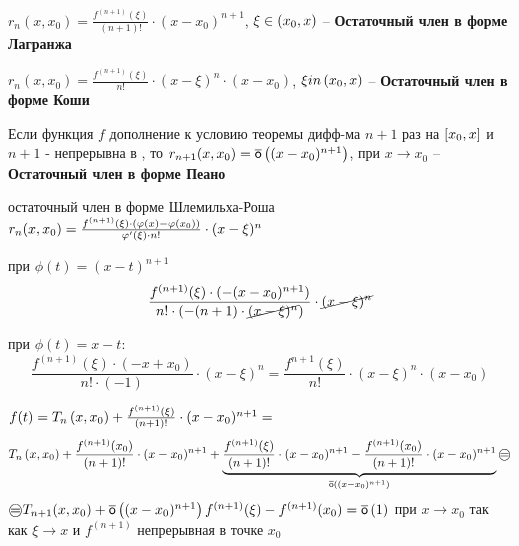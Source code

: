 \begin{sledsv}
	\begin{enumerate*}
		\item $r_n(x,x_0) = \frac{f^{(n+1)}(\xi)}{(n+1)!}\cdot (x-x_0)^{n+1}$, $\xi \in \left( x_0,x\right)$ -- \textbf{Остаточный член в форме Лагранжа}
		\item $r_n(x,x_0) = \frac{f^{(n+1)}(\xi)}{n!}\cdot (x-\xi)^{n}\cdot (x-x_0)$, $\xi in \left( x_0, x\right)$ -- \textbf{Остаточный член в форме Коши}
		\item Если функция $f$ дополнение к условию теоремы дифф-ма $n+1$ раз на $\left[ x_0,x\right]$ и $n+1$ - непрерывна в , то $r_{n+1}(x,x_0) = \overline{\mathsf{o}}\left( (x-x_0)^{n+1}\right)$, при $x \to x_0$  -- \textbf{Остаточный член в форме Пеано}
	\end{enumerate*}

	\begin{dokvo}
		остаточный член в форме Шлемильха-Роша $r_n(x,x_0) = \frac{f^{(n+1)}(\xi)  \cdot (\varphi(x)-\varphi(x_0))}{\varphi^{\prime}(\xi) \cdot n!}\cdot (x-\xi)^{n}$
		\begin{enumerate*}
			\item при $\phi(t) = (x-t)^{n+1}$
			$$\frac{f^{(n+1)}(\xi) \cdot (-(x-x_0)^{n+1})}{n! \cdot (-(n+1)\cdot \cancel{(x - \xi)^{n}})}\cdot \cancel{(x-\xi)^{n}}$$
			\item при $\phi(t) = x - t:$
			$$\frac{f^{(n+1)}(\xi)\cdot (-x + x_0)}{n! \cdot (-1)}\cdot (x - \xi)^n = \frac{f^{n+1}(\xi)}{n!}\cdot(x-\xi)^{n}\cdot (x - x_0)$$
			\item $f(t) = T_n\left( x,x_0\right) + \frac{f^{(n+1)}(\xi)}{(n+1)!}\cdot (x-x_0)^{n+1} =$
			$$T_n\skobk{x,x_0} + \frac{f^{(n+1)}(x_0)}{(n+1)!}\cdot (x-x_0)^{n+1} + \underbrace{\frac{f^{(n+1)}(\xi)}{(n+1)!}\cdot (x-x_0)^{n+1} - \frac{f^{(n+1)}(x_0)}{(n+1)!}\cdot (x-x_0)^{n+1}}_{\omaloe{(x-x_0)^{n+1}}} \oeq$$
			$\oeq T_{n+1}(x,x_0) + \omaloe{ (x-x_0)^{n+1}} f^{(n+1)}(\xi)-f^{(n+1)}(x_0)=\omaloe{1}$ при $x\to x_0$ так как $\xi \to x$ и $f^{(n+1)}$ непрерывная в точке $x_0$
		\end{enumerate*}
	\end{dokvo}
\end{sledsv}

